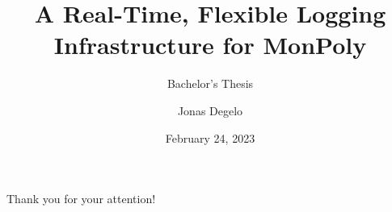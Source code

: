 \documentclass{beamer}
\title{A Real-Time, Flexible Logging Infrastructure for MonPoly}
\subtitle{Bachelor's Thesis}
\author{Jonas Degelo}
\institute{ETH Zürich}
\date{February 24, 2023}
\begin{document}
    \begin{frame}
        \titlepage
    \end{frame}


    
    
    
    
    
    

    \begin{frame}{}
        \centering \Large
        Thank you for your attention!
    \end{frame}
\end{document}

